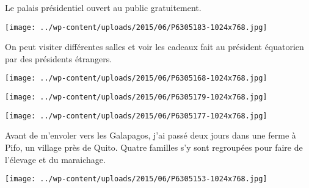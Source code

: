 \pagebreak

Le palais présidentiel ouvert au public gratuitement. 
\begin{center} 
\texttt{[image: ../wp-content/uploads/2015/06/P6305183-1024x768.jpg]} 
\end{center}

On peut visiter différentes salles et voir les cadeaux fait au président équatorien par des présidents étrangers. 
\begin{center} 
\texttt{[image: ../wp-content/uploads/2015/06/P6305168-1024x768.jpg]} 
\end{center}
\begin{center} 
\texttt{[image: ../wp-content/uploads/2015/06/P6305179-1024x768.jpg]} 
\end{center}
\begin{center} 
\texttt{[image: ../wp-content/uploads/2015/06/P6305177-1024x768.jpg]} 
\end{center}
\pagebreak

Avant de m'envoler vers les Galapagos, j'ai passé deux jours dans une ferme à Pifo, un village près de Quito. Quatre familles s'y sont regroupées pour faire de l'élevage et du maraichage.
\begin{center} 
\texttt{[image: ../wp-content/uploads/2015/06/P6305153-1024x768.jpg]} 
\end{center}